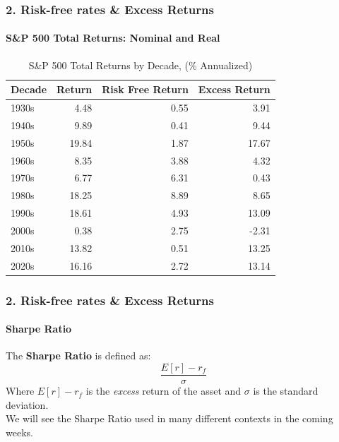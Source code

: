 \documentclass{beamer}
\begin{document}
{
\begin{frame}[t]
    \frametitle{2. Risk-free rates \& Excess Returns}
    \framesubtitle{S\&P 500 Total Returns: Nominal and Real}
    
    \vspace{-1em}
    \scriptsize
    \begin{table}
        \caption{S\&P 500 Total Returns by Decade, (\% Annualized)}
        \begin{tabular}{lrrr}
        \toprule
        Decade & Return & Risk Free Return & Excess Return \\
        \midrule
        1930s & 4.48 & 0.55 & 3.91 \\
        1940s & 9.89 & 0.41 & 9.44 \\
        1950s & 19.84 & 1.87 & 17.67 \\
        1960s & 8.35 & 3.88 & 4.32 \\
        1970s & 6.77 & 6.31 & 0.43 \\
        1980s & 18.25 & 8.89 & 8.65 \\
        1990s & 18.61 & 4.93 & 13.09 \\
        2000s & 0.38 & 2.75 & -2.31 \\
        2010s & 13.82 & 0.51 & 13.25 \\
        2020s & 16.16 & 2.72 & 13.14 \\
        \bottomrule
        \end{tabular}
        \end{table}


\end{frame}
}

\begin{frame}[t]
  \frametitle{2. Risk-free rates \& Excess Returns}
  \framesubtitle{Sharpe Ratio}

  The \textbf{Sharpe Ratio} is defined as:
  $$\frac{E[r] - r_f}{\sigma}$$
  Where $E[r] - r_f$ is the \textit{excess} return of the asset and $\sigma$ is the standard deviation.\\
  \vspace{1em}
  We will see the Sharpe Ratio used in many different contexts in the coming weeks.

\end{frame}
\end{document}
